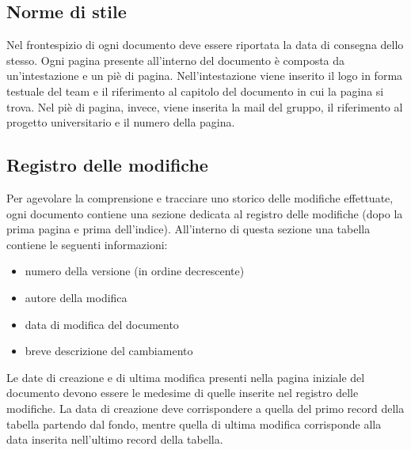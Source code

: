 \documentclass[a4paper,11pt]{article}
\begin{document}
\subsection{Norme di stile}
Nel frontespizio di ogni documento deve essere riportata la data di consegna dello stesso. Ogni pagina presente all'interno del documento \`e composta da un'intestazione e un pi\`e di pagina. Nell'intestazione viene inserito il logo in forma testuale del team e il riferimento al capitolo del documento in cui la pagina si trova. Nel pi\`e di pagina, invece, viene inserita la mail del gruppo, il riferimento al progetto universitario e il numero della pagina.
\subsection{Registro delle modifiche}
Per agevolare la comprensione e tracciare uno storico delle modifiche effettuate, ogni documento contiene una sezione dedicata al registro delle modifiche (dopo la prima pagina e prima dell'indice). All'interno di questa sezione una tabella contiene le seguenti informazioni:
\begin{itemize}
\item numero della versione (in ordine decrescente)
\item autore della modifica
\item data di modifica del documento
\item breve descrizione del cambiamento
\end{itemize}
Le date di creazione e di ultima modifica presenti nella pagina iniziale del documento devono essere le medesime di quelle inserite nel registro delle modifiche.
La data di creazione deve corrispondere a quella del primo record della tabella partendo dal fondo, mentre quella di ultima modifica corrisponde alla data inserita nell'ultimo record della tabella.  
\end{document}
